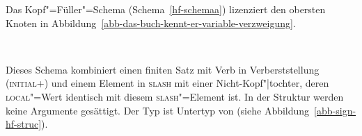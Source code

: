 Das Kopf"=Füller"=Schema (Schema~\ref{hf-schemaa}) lizenziert den obersten Knoten in
Abbildung~\ref{abb-das-buch-kennt-er-variable-verzweigung}.
\begin{schema}[Kopf"=Füller"=Schema (vorläufig)]
\label{hf-schemaa}%
 \impl\\
\end{schema}
Dieses Schema kombiniert einen finiten Satz mit Verb in Verberststellung (\textsc{initial}+) und einem Element in \textsc{slash}
mit einer Nicht-Kopf"|tochter, deren \textsc{local}"=Wert identisch mit diesem \textsc{slash}"=Element ist.
In der Struktur werden keine Argumente gesättigt. Der Typ  ist Untertyp von
 (siehe Abbildung~\ref{abb-sign-hf-struc}).
